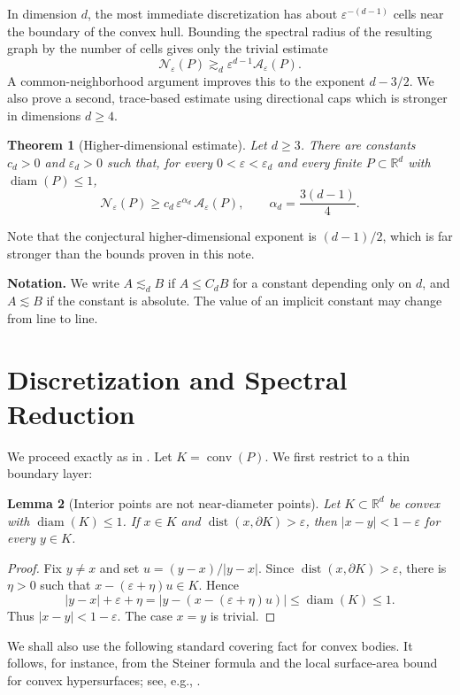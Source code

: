 \documentclass[11pt]{article}
\newtheorem{theorem}{Theorem}[section]
\newtheorem{lemma}[theorem]{Lemma}
\newcommand{\R}{\mathbb R}
\newcommand{\eps}{\varepsilon}
\newcommand{\diam}{\operatorname{diam}}
\newcommand{\dist}{\operatorname{dist}}
\newcommand{\cN}{\mathcal N}
\newcommand{\cA}{\mathcal A}
\begin{document}
\noindent
In dimension $d$, the most immediate discretization has about $\eps^{-(d-1)}$ cells near the boundary of the convex hull.  Bounding the spectral radius of the resulting graph by the number of cells gives only the trivial estimate
\[
   \cN_\eps(P)\gtrsim_d \eps^{d-1}\cA_\eps(P).
\]
A common-neighborhood argument improves this to the exponent $d-3/2$.  We also prove a second, trace-based estimate using directional caps which is stronger in dimensions $d\ge4$.

\begin{theorem}[Higher-dimensional estimate]\label{thm:higher}
Let $d\ge3$.  There are constants $c_d>0$ and $\eps_d>0$ such that, for every $0<\eps<\eps_d$ and every finite $P\subset\R^d$ with $\diam(P)\le1$,
\[
   \cN_\eps(P)
   \ge
   c_d\,\eps^{\alpha_d}\,\cA_\eps(P),
   \qquad
   \alpha_d=\frac{3(d-1)}4.
\]
\end{theorem}

\noindent
Note that the conjectural higher-dimensional exponent is $(d-1)/2$, which is far stronger than the bounds proven in this note.

\medskip
\noindent\textbf{Notation.}
We write $A\lesssim_d B$ if $A\le C_dB$ for a constant depending only on $d$, and $A\lesssim B$ if the constant is absolute.  The value of an implicit constant may change from line to line.

\section{Discretization and Spectral Reduction}

We proceed exactly as in \cite{Steinerberger2025}. Let $K=\operatorname{conv}(P)$.  We first restrict to a thin boundary layer:

\begin{lemma}[Interior points are not near-diameter points]\label{lem:interior}
Let $K\subset\R^d$ be convex with $\diam(K)\le1$.  If $x\in K$ and $\dist(x,\partial K)>\eps$, then $|x-y|<1-\eps$ for every $y\in K$.
\end{lemma}

\begin{proof}
Fix $y\ne x$ and set $u=(y-x)/|y-x|$.  Since $\dist(x,\partial K)>\eps$, there is $\eta>0$ such that $x-(\eps+\eta)u\in K$.  Hence
\[
   |y-x|+\eps+\eta
   =|y-(x-(\eps+\eta)u)|
   \le \diam(K)
   \le 1.
\]
Thus $|x-y|<1-\eps$.  The case $x=y$ is trivial.
\end{proof}

\smallskip
\noindent
We shall also use the following standard covering fact for convex bodies.  It follows, for instance, from the Steiner formula and the local surface-area bound for convex hypersurfaces; see, e.g., \cite[Chapters 4 and 5]{Schneider2014}.
\end{document}
